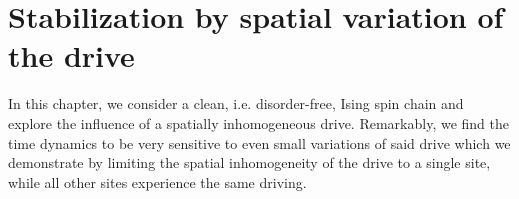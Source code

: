 \chapter{Stabilization by spatial variation of the drive}\label{ch:metronome-spin}

In this chapter, we consider a clean, i.e. disorder-free, Ising spin chain and explore the influence of a spatially inhomogeneous drive. Remarkably, we find the time dynamics to be very sensitive to even small variations of said drive which we demonstrate by limiting the spatial inhomogeneity of the drive to a single site, while all other sites experience the same driving. 

\newpage
{}
